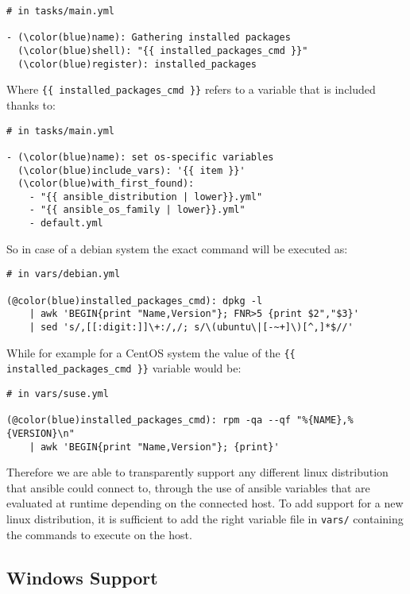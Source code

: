 \documentclass[11pt]{article}
\begin{document}
\begin{Verbatim}[commandchars=\\\(\)]
# in tasks/main.yml

- (\color(blue)name): Gathering installed packages
  (\color(blue)shell): "{{ installed_packages_cmd }}"
  (\color(blue)register): installed_packages
\end{Verbatim}

Where {\tt \{\{ installed\_packages\_cmd \}\}} refers to a variable that is included thanks to:

\begin{Verbatim}[commandchars=\\\(\)]
# in tasks/main.yml

- (\color(blue)name): set os-specific variables
  (\color(blue)include_vars): '{{ item }}'
  (\color(blue)with_first_found):
    - "{{ ansible_distribution | lower}}.yml"
    - "{{ ansible_os_family | lower}}.yml"
    - default.yml
\end{Verbatim}

So in case of a debian system the exact command will be executed as:

\begin{Verbatim}[commandchars=@\(\)]
# in vars/debian.yml

(@color(blue)installed_packages_cmd): dpkg -l 
    | awk 'BEGIN{print "Name,Version"}; FNR>5 {print $2","$3}' 
    | sed 's/,[[:digit:]]\+:/,/; s/\(ubuntu\|[-~+]\)[^,]*$//'
\end{Verbatim}

While for example for a CentOS system the value of the {\tt \{\{ installed\_packages\_cmd \}\}} variable would be:

\begin{Verbatim}[commandchars=@\(\)]
# in vars/suse.yml

(@color(blue)installed_packages_cmd): rpm -qa --qf "%{NAME},%{VERSION}\n" 
    | awk 'BEGIN{print "Name,Version"}; {print}'
\end{Verbatim}

Therefore we are able to transparently support any different linux distribution that ansible could connect to, through the use of ansible variables that are evaluated at runtime depending on the connected host. To add support for a new linux distribution, it is sufficient to add the right variable file in {\tt vars/} containing the commands to execute on the host.

\subsection{Windows Support}
\end{document}
